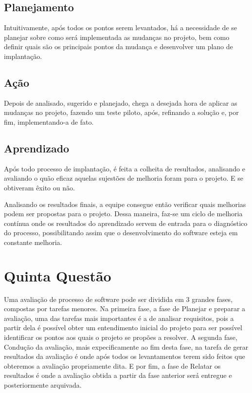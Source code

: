 \subsection{Planejamento}
\label{sub:Planejamento}

Intuitivamente, após todos os pontos serem levantados, há a necessidade de se
planejar sobre como será implementada as mudanças no projeto, bem como
definir quais são os principais pontos da mudança e desenvolver um plano de
implantação.

\subsection{Ação}
\label{sub:Ação}

Depois de analisado, sugerido e planejado, chega a desejada hora de aplicar as
mudanças no projeto, fazendo um teste piloto, após, refinando a solução e, por
fim, implementando-a de fato.

\subsection{Aprendizado}
\label{sub:Aprendizado}

Após todo processo de implantação, é feita a colheita de resultados, analisando
e avaliando o quão eficaz aquelas sujestões de melhoria foram para o projeto. E
se obtiveram êxito ou não.

Analisando os resultados finais, a equipe consegue então verificar quais melhorias
podem ser propostas para o projeto. Dessa maneira, faz-se um ciclo de melhoria
contínua onde os resultados do aprendizado servem de entrada para o diagnóstico
do processo, possibilitando assim que o desenvolvimento do software esteja em
constante melhoria.

\section{Quinta Questão}
\label{sec:Quinta Questão}

Uma avaliação de processo de software pode ser dividida em 3 grandes fases, compostas por tarefas menores.
Na primeira fase, a fase de Planejar e preparar a avaliação, uma das tarefas mais importantes é a de analisar requisitos,
pois a partir dela é possível obter um entendimento inicial do projeto para ser possível identificar os pontos aos quais
o projeto se propões a resolver.
A segunda fase, Condução da avaliação, mais expecificamente ao fim desta fase, na tarefa de gerar resultados da avaliação é
onde após todos os levantamentos terem sido feitos que obteremos a avaliação propriamente dita.
E por fim, a fase de Relatar os resultados é onde a avaliação obtida a partir da fase anterior será entregue e posteriormente arquivada.
